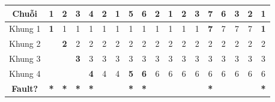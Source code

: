 \documentclass[11pt,a4paper]{article}
\begin{document}
\begin{table}[h!]
\centering
\scriptsize
\begin{tabular}{|c|c|c|c|c|c|c|c|c|c|c|c|c|c|c|c|c|c|}
\hline
\textbf{Chuỗi} & \textbf{1} & \textbf{2} & \textbf{3} & \textbf{4} & \textbf{2} & \textbf{1} & \textbf{5} & \textbf{6} & \textbf{2} & \textbf{1} & \textbf{2} & \textbf{3} & \textbf{7} & \textbf{6} & \textbf{3} & \textbf{2} & \textbf{1} \\ \hline
Khung 1 & \textbf{1} & 1 & 1 & 1 & 1 & 1 & 1 & 1 & 1 & 1 & 1 & 1 & \textbf{7} & 7 & 7 & 7 & \textbf{1} \\ \hline
Khung 2 &   & \textbf{2} & 2 & 2 & 2 & 2 & 2 & 2 & 2 & 2 & 2 & 2 & 2 & 2 & 2 & 2 & 2 \\ \hline
Khung 3 &   &   & \textbf{3} & 3 & 3 & 3 & 3 & 3 & 3 & 3 & 3 & 3 & 3 & 3 & 3 & 3 & 3 \\ \hline
Khung 4 &   &   &   & \textbf{4} & 4 & 4 & \textbf{5} & \textbf{6} & 6 & 6 & 6 & 6 & 6 & 6 & 6 & 6 & 6 \\ \hline
\textbf{Fault?} & \textbf{*} & \textbf{*} & \textbf{*} & \textbf{*} & & & \textbf{*} & \textbf{*} & & & & & \textbf{*} & & & & \textbf{*} \\ \hline
\end{tabular}
\end{table}
\end{document}
